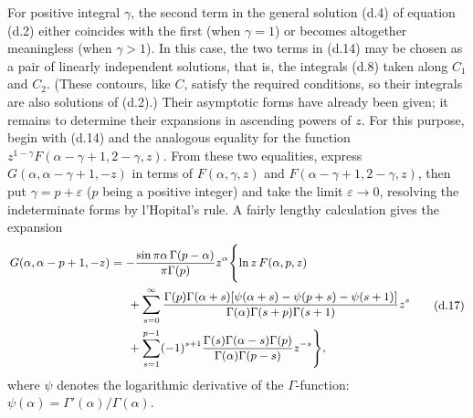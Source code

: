For positive integral $\gamma$, the second term in the general solution (d.4)
of equation (d.2) either coincides with the first (when $\gamma=1$) or becomes
altogether meaningless (when $\gamma>1$). In this case, the two terms in
(d.14) may be chosen as a pair of linearly independent solutions, that is, the
integrals (d.8) taken along $C_1$ and $C_2$. (These contours, like $C$, satisfy
the required conditions, so their integrals are also solutions of (d.2).)
Their asymptotic forms have already been given; it remains to determine their
expansions in ascending powers of $z$. For this purpose, begin with (d.14) and
the analogous equality for the function
$z^{1-\gamma}F(\alpha-\gamma+1,2-\gamma,z)$. From these two equalities, express
$G(\alpha,\alpha-\gamma+1,-z)$ in terms of $F(\alpha,\gamma,z)$ and
$F(\alpha-\gamma+1,2-\gamma,z)$, then put $\gamma=p+\varepsilon$ ($p$ being a
positive integer) and take the limit $\varepsilon\to0$, resolving the
indeterminate forms by l'Hopital's rule. A fairly lengthy calculation gives
the expansion
\begin{equation}
 \small
 \begin{split}
 G(\alpha,\alpha-p+1,-z)
 &=-\frac{\sin\pi\alpha\,\Gamma(p-\alpha)}{\pi\Gamma(p)}z^\alpha
 \Biggl\{\ln z\,F(\alpha,p,z)\\
 &\hspace{1.5em}+\sum_{s=0}^{\infty}
 \frac{\Gamma(p)\Gamma(\alpha+s)
 [\psi(\alpha+s)-\psi(p+s)-\psi(s+1)]}
 {\Gamma(\alpha)\Gamma(s+p)\Gamma(s+1)}z^s\\
 &\hspace{1.5em}+\sum_{s=1}^{p-1}(-1)^{s+1}
 \frac{\Gamma(s)\Gamma(\alpha-s)\Gamma(p)}
 {\Gamma(\alpha)\Gamma(p-s)}z^{-s}\Biggr\},
 \end{split}
 \tag{d.17}
\end{equation}
where $\psi$ denotes the logarithmic derivative of the $\Gamma$-function:
$\psi(\alpha)=\Gamma'(\alpha)/\Gamma(\alpha)$.
